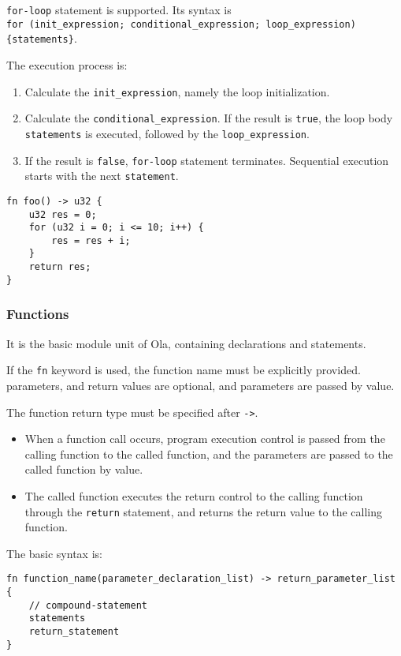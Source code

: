 \verb|for-loop| statement is supported. Its syntax is \\
\verb|for (init_expression; conditional_expression; loop_expression) {statements}|.

The execution process is:
\begin{enumerate}
    \item Calculate the \verb|init_expression|, namely the loop initialization.
    \item Calculate the \verb|conditional_expression|. If the result is \verb|true|, the loop body \verb|statements| is executed, followed by the \verb|loop_expression|.
    \item If the result is \verb|false|, \verb|for-loop| statement terminates. Sequential execution starts with the next \verb|statement|.
\end{enumerate}

\begin{lstlisting}
fn foo() -> u32 {
    u32 res = 0;
    for (u32 i = 0; i <= 10; i++) {
        res = res + i;
    }
    return res;
}
\end{lstlisting}

\subsubsection{Functions}

It is the basic module unit of Ola, containing declarations and statements.

If the \verb|fn| keyword is used, the function name must be explicitly provided. parameters, and return values are optional, and parameters are passed by value.

The function return type must be specified after \verb|->|.

\begin{itemize}
    \item When a function call occurs, program execution control is passed from the calling function to the called function, and the parameters are passed to the called function by value. 
    \item The called function executes the return control to the calling function through the \verb|return| statement, and returns the return value to the calling function.
\end{itemize}

The basic syntax is:

\begin{lstlisting}
fn function_name(parameter_declaration_list) -> return_parameter_list {
    // compound-statement
    statements
    return_statement
}
\end{lstlisting}


